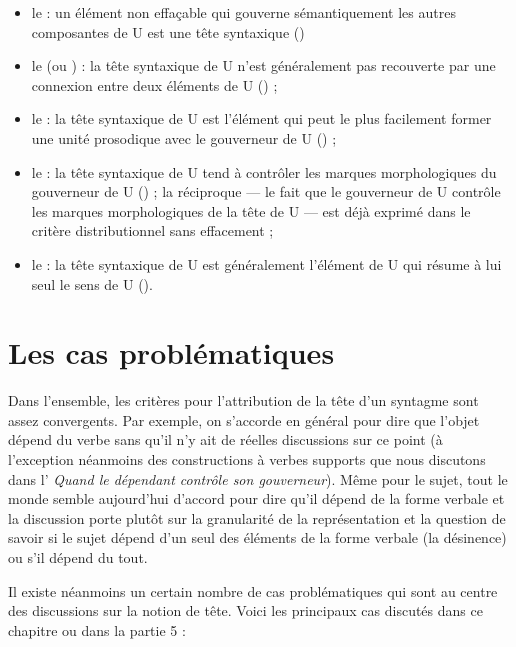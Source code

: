 \begin{itemize}
\item le  : un élément non effaçable qui gouverne sémantiquement les autres composantes de U est une tête syntaxique ()
\item le  (ou ) : la tête syntaxique de U n’est généralement pas recouverte par une connexion entre deux éléments de U () ;
\item le  : la tête syntaxique de U est l’élément qui peut le plus facilement former une unité prosodique avec le gouverneur de U () ;
\item le  : la tête syntaxique de U tend à contrôler les marques morphologiques du gouverneur de U () ; la réciproque — le fait que le gouverneur de U contrôle les marques morphologiques de la tête de U — est déjà exprimé dans le critère distributionnel sans effacement ;
\item le  : la tête syntaxique de U est généralement l’élément de U qui résume à lui seul le sens de U ().
\end{itemize}

\section{Les cas problématiques}\label{sec:3.3.21}

Dans l’ensemble, les critères pour l’attribution de la tête d’un syntagme sont assez convergents. Par exemple, on s’accorde en général pour dire que l’objet dépend du verbe sans qu’il n’y ait de réelles discussions sur ce point (à l’exception néanmoins des constructions à verbes supports que nous discutons dans l’ \textit{Quand le dépendant contrôle son gouverneur}). Même pour le sujet, tout le monde semble aujourd’hui d’accord pour dire qu’il dépend de la forme verbale et la discussion porte plutôt sur la granularité de la représentation et la question de savoir si le sujet dépend d’un seul des éléments de la forme verbale (la désinence) ou s’il dépend du tout.

Il existe néanmoins un certain nombre de cas problématiques qui sont au centre des discussions sur la notion de tête. Voici les principaux cas discutés dans ce chapitre ou dans la partie 5 :

